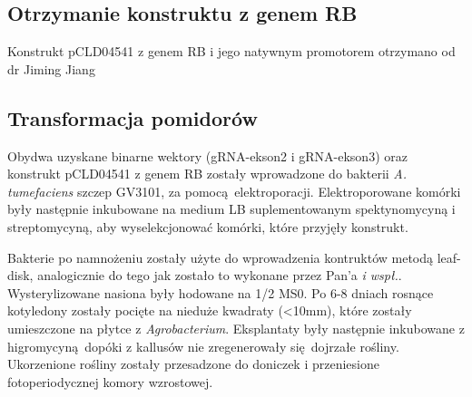 \documentclass[two column, twoside, a4paper]{article}
\begin{document}
\subsection{Otrzymanie konstruktu z genem RB}

Konstrukt pCLD04541 z genem RB i jego natywnym promotorem otrzymano od dr Jiming Jiang\autocite{Song2003}

\subsection{Transformacja pomidorów}

Obydwa uzyskane binarne wektory (gRNA-ekson2 i gRNA-ekson3) oraz konstrukt pCLD04541 z genem RB zostały wprowadzone do bakterii \textit{A. tumefaciens} szczep GV3101, za pomocą elektroporacji. Elektroporowane komórki były następnie inkubowane na medium LB suplementowanym spektynomycyną i streptomycyną, aby wyselekcjonować komórki, które przyjęły konstrukt.

Bakterie po namnożeniu zostały użyte do wprowadzenia kontruktów metodą leaf-disk\autocite{McCormick1986}, analogicznie do tego jak zostało to wykonane przez Pan'a \textit{i wspł.}\autocite{Pan2016}. Wysterylizowane nasiona były hodowane na 1/2 MS0. Po 6-8 dniach rosnące kotyledony zostały pocięte na nieduże kwadraty (<10mm), które zostały umieszczone na płytce z \textit{Agrobacterium}. Eksplantaty były następnie inkubowane z higromycyną dopóki z kallusów nie zregenerowały się dojrzałe rośliny. Ukorzenione rośliny zostały przesadzone do doniczek i przeniesione fotoperiodycznej komory wzrostowej.
\end{document}
